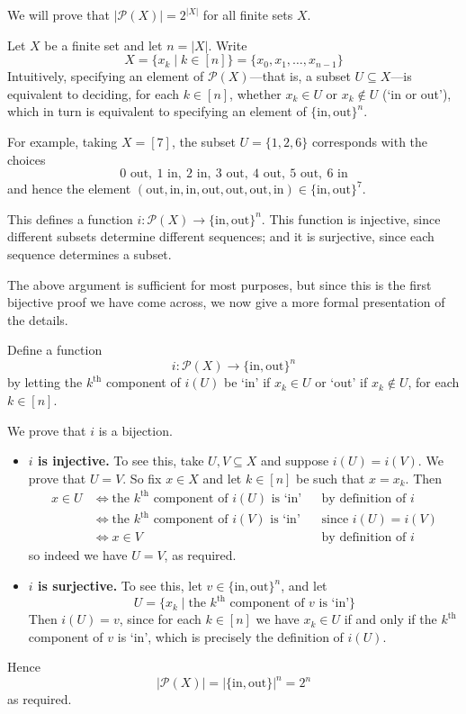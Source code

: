 \begin{example}
\label{exNumSubsetsOfFiniteSet}
We will prove that $|\mathcal{P}(X)| = 2^{|X|}$ for all finite sets $X$.

Let $X$ be a finite set and let $n=|X|$. Write
\[ X = \{ x_k \mid k \in [n] \} = \{ x_0, x_1, \dots, x_{n-1} \} \]
Intuitively, specifying an element of $\mathcal{P}(X)$---that is, a subset $U \subseteq X$---is equivalent to deciding, for each $k \in [n]$, whether $x_k \in U$ or $x_k \not \in U$ (`in or out'), which in turn is equivalent to specifying an element of $\{ \text{in}, \text{out} \}^n$.

For example, taking $X=[7]$, the subset $U = \{ 1, 2, 6 \}$ corresponds with the choices
\[ 0 \text{ out},\ 1 \text{ in},\ 2 \text{ in},\ 3 \text{ out},\ 4 \text{ out},\ 5 \text{ out},\ 6 \text{ in} \]
and hence the element $(\text{out}, \text{in}, \text{in}, \text{out}, \text{out}, \text{out}, \text{in}) \in \{ \text{in}, \text{out} \}^7$.

This defines a function $i : \mathcal{P}(X) \to \{ \text{in}, \text{out} \}^n$. This function is injective, since different subsets determine different sequences; and it is surjective, since each sequence determines a subset.

The above argument is sufficient for most purposes, but since this is the first bijective proof we have come across, we now give a more formal presentation of the details.

Define a function
\[ i : \mathcal{P}(X) \to \{ \text{in},\text{out} \}^n \]
by letting the $k^{\text{th}}$ component of $i(U)$ be `in' if $x_k \in U$ or `out' if $x_k \not \in U$, for each $k \in [n]$.

We prove that $i$ is a bijection.
\begin{itemize}
\item \textbf{$i$ is injective.} To see this, take $U,V \subseteq X$ and suppose $i(U) = i(V)$. We prove that $U=V$. So fix $x \in X$ and let $k \in [n]$ be such that $x=x_k$. Then
\begin{align*}
x \in U &\Leftrightarrow \text{the $k^{\text{th}}$ component of $i(U)$ is `in'} && \text{by definition of $i$} \\
&\Leftrightarrow \text{the $k^{\text{th}}$ component of $i(V)$ is `in'} && \text{since $i(U)=i(V)$} \\
&\Leftrightarrow x \in V && \text{by definition of $i$}
\end{align*}
so indeed we have $U=V$, as required.
\item \textbf{$i$ is surjective.} To see this, let $v \in \{ \text{in},\text{out} \}^n$, and let
\[ U = \{ x_k \mid \text{the } k^{\text{th}} \text{ component of } v \text{ is `in'} \} \]
Then $i(U)=v$, since for each $k \in [n]$ we have $x_k \in U$ if and only if the $k^{\text{th}}$ component of $v$ is `in', which is precisely the definition of $i(U)$.
\end{itemize}

Hence
\[ |\mathcal{P}(X)| = |\{\text{in},\text{out}\}|^n = 2^n \]
as required.
\end{example}

